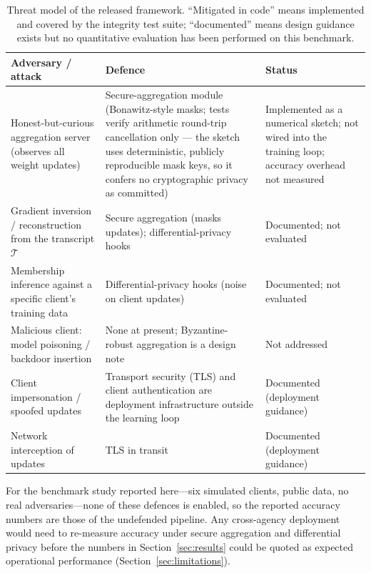 \begin{table}[t]
\centering
\caption{Threat model of the released framework. ``Mitigated in code''
means implemented and covered by the integrity test suite;
``documented'' means design guidance exists but no quantitative
evaluation has been performed on this benchmark.}
\label{tab:threat}
\small
\begin{tabularx}{\textwidth}{@{}>{\raggedright\arraybackslash}X >{\raggedright\arraybackslash}X >{\raggedright\arraybackslash}X@{}}
\toprule
\textbf{Adversary / attack} & \textbf{Defence} & \textbf{Status} \\
\midrule
Honest-but-curious aggregation server (observes all weight
updates) & Secure-aggregation module (Bonawitz-style masks;
tests verify arithmetic round-trip cancellation only --- the sketch
uses deterministic, publicly reproducible mask keys, so it confers
no cryptographic privacy as committed) & Implemented as a numerical
sketch; not wired into the training loop; accuracy overhead not
measured \\
\addlinespace[2pt]
Gradient inversion / reconstruction from the transcript
$\mathcal{T}$ \cite{zhu2019} & Secure aggregation (masks updates);
differential-privacy hooks & Documented; not evaluated \\
\addlinespace[2pt]
Membership inference against a specific client's training data &
Differential-privacy hooks (noise on client updates) & Documented;
not evaluated \\
\addlinespace[2pt]
Malicious client: model poisoning / backdoor insertion & None at
present; Byzantine-robust aggregation is a design note & Not
addressed \\
\addlinespace[2pt]
Client impersonation / spoofed updates & Transport security (TLS)
and client authentication are deployment infrastructure outside the
learning loop & Documented (deployment guidance) \\
\addlinespace[2pt]
Network interception of updates & TLS in transit & Documented
(deployment guidance) \\
\bottomrule
\end{tabularx}
\end{table}

For the benchmark study reported here---six simulated clients, public
data, no real adversaries---none of these defences is enabled, so the
reported accuracy numbers are those of the undefended pipeline. Any
cross-agency deployment would need to re-measure accuracy under secure
aggregation and differential privacy before the numbers in
Section~\ref{sec:results} could be quoted as expected operational
performance (Section~\ref{sec:limitations}).

